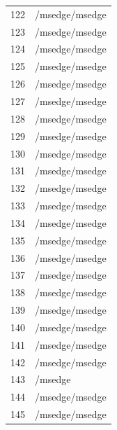 \documentclass[a4paper,twoside,12pt]{book}
\begin{document}
\begin{appendices}
\begin{table}
\begin{tabular}{ll}
		122 &                                     /msedge/msedge \\
		123 &                                     /msedge/msedge \\
		124 &                                     /msedge/msedge \\
		125 &                                     /msedge/msedge \\
		126 &                                     /msedge/msedge \\
		127 &                                     /msedge/msedge \\
		128 &                                     /msedge/msedge \\
		129 &                                     /msedge/msedge \\
		130 &                                     /msedge/msedge \\
		131 &                                     /msedge/msedge \\
		132 &                                     /msedge/msedge \\
		133 &                                     /msedge/msedge \\
		134 &                                     /msedge/msedge \\
		135 &                                     /msedge/msedge \\
		136 &                                     /msedge/msedge \\
		137 &                                     /msedge/msedge \\
		138 &                                     /msedge/msedge \\
		139 &                                     /msedge/msedge \\
		140 &                                     /msedge/msedge \\
		141 &                                     /msedge/msedge \\
		142 &                                     /msedge/msedge \\
		143 &                                            /msedge \\
		144 &                                     /msedge/msedge \\
		145 &                                     /msedge/msedge \\
		\bottomrule
	\end{tabular}
\end{table}
\begin{table}

\end{table}
\end{appendices}
\end{document}
